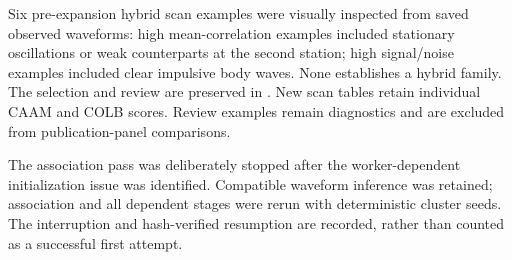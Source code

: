 Six pre-expansion hybrid scan examples were visually inspected from saved observed waveforms: high mean-correlation examples included stationary oscillations or weak counterparts at the second station; high signal/noise examples included clear impulsive body waves. None establishes a hybrid family. The selection and review are preserved in . New scan tables retain individual CAAM and COLB scores. Review examples remain diagnostics and are excluded from publication-panel comparisons.

The association pass was deliberately stopped after the worker-dependent initialization issue was identified. Compatible waveform inference was retained; association and all dependent stages were rerun with deterministic cluster seeds. The interruption and hash-verified resumption are recorded, rather than counted as a successful first attempt.

